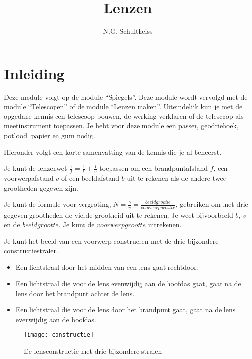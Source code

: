 



\title{Lenzen}
\author{N.G. Schultheiss}
\date{}

\maketitle
\thispagestyle{firststyle}

\section{Inleiding}

Deze module volgt op de module ``Spiegels''. Deze module wordt vervolgd
met de module ``Telescopen'' of de module ``Lenzen maken''. Uiteindelijk
kun je met de opgedane kennis een telescoop bouwen, de werking verklaren
of de telescoop als meetinstrument toepassen. Je hebt voor deze module
een passer, geodriehoek, potlood, papier en gum nodig.

Hieronder volgt een korte samenvatting van de kennis die je al beheerst.

Je kunt de lenzenwet $\frac{1}{f}=\frac{1}{b}+\frac{1}{v}$ toepassen
om een brandpuntafstand $f$, een voorwerpafstand $v$ of een beeldafstand
$b$ uit te rekenen als de andere twee grootheden gegeven zijn.

Je kunt de formule voor vergroting, $N=\frac{b}{v}=\frac{beeldgrootte}{voorwerpgrootte}$,
gebruiken om met drie gegeven grootheden de vierde grootheid uit te
rekenen. Je weet bijvoorbeeld $b$, $v$ en de $beeldgrootte$. Je
kunt de $voorwerpgrootte$ uitrekenen.

Je kunt het beeld van een voorwerp construeren met de drie bijzondere
constructiestralen.
\begin{itemize}
\item Een lichtstraal door het midden van een lens gaat rechtdoor.
\item Een lichtstraal die voor de lens evenwijdig aan de hoofdas gaat, gaat
na de lens door het brandpunt achter de lens.
\item Een lichtstraal die voor de lens door het brandpunt gaat, gaat na
de lens evenwijdig aan de hoofdas.
\end{itemize}
\begin{figure}[H]
\noindent \begin{centering}
\texttt{[image: constructie]}
\par\end{centering}

\caption{De lensconstructie met drie bijzondere stralen}
\end{figure}



